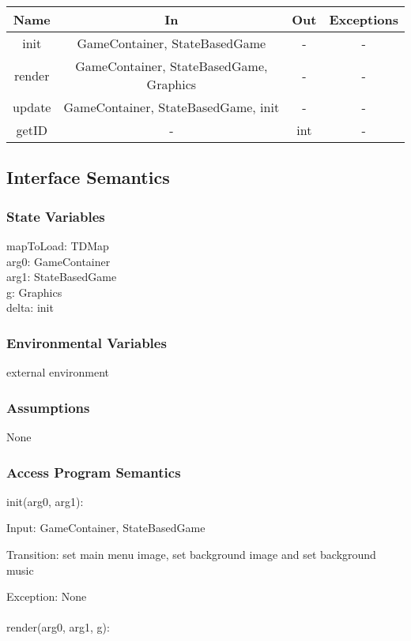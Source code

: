 \documentclass[12,english]{article}
\begin{document}
	\begin{tabular}[pos]{|c|c|c|c|}
	\hline
	\textbf{Name}& \textbf{In} & \textbf{Out} & \textbf{Exceptions} \\ 
	\hline
	init & GameContainer, StateBasedGame & - & - \\ \hline
	render & GameContainer, StateBasedGame, Graphics & - & - \\ \hline
	update & GameContainer, StateBasedGame, init & - & - \\ \hline
	getID & - & int & - \\ \hline
	
	
					
	\end{tabular}		
		
	\subsection{Interface Semantics}
		\subsubsection{State Variables}
		mapToLoad: TDMap\\
	    arg0: GameContainer\\
	    arg1: StateBasedGame\\
	    g: Graphics\\
	    delta: init\\
		\subsubsection{Environmental Variables}
		\color{red} external environment \color{black}
		\subsubsection{Assumptions}
        None

		\subsubsection{Access Program Semantics}
		init(arg0, arg1):
		
		Input: GameContainer, StateBasedGame
		
		Transition: \color{red} set main menu image, set background image and set background music \color{black}
		
		Exception: None\\
		\\
		render(arg0, arg1, g):
		
\end{document}
